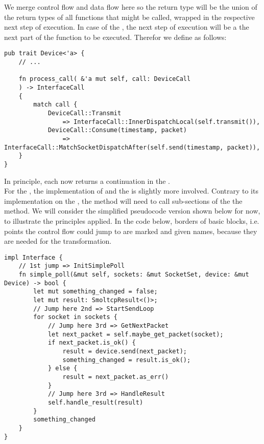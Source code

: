 We merge control flow and data flow here so the return type will be the union of the return types of all functions that might be called, wrapped in the respective next step of execution. In case of the \dev{}, the next step of execution will be a the next part of the  function to be executed. Therefor we define  as follows:
\begin{verbatim}
pub trait Device<'a> {
    // ...
    
    fn process_call( &'a mut self, call: DeviceCall
    ) -> InterfaceCall
    {
        match call {
            DeviceCall::Transmit
                => InterfaceCall::InnerDispatchLocal(self.transmit()),
            DeviceCall::Consume(timestamp, packet)
                => InterfaceCall::MatchSocketDispatchAfter(self.send(timestamp, packet)),
    }
}
\end{verbatim}

In principle, each  now returns a continuation in the \stack{}.\\

For the \stack{}, the implementation of  and the  is slightly more involved. Contrary to its implementation on the \dev{}, the  method will need to call sub-sections of the the  method. We will consider the simplified pseudocode version shown below for now, to illustrate the principles applied. In the code below, borders of basic blocks, i.e. points the control flow could jump to are marked and given names, because they are needed for the transformation. 

\begin{verbatim}
impl Interface {
    // 1st jump => InitSimplePoll
    fn simple_poll(&mut self, sockets: &mut SocketSet, device: &mut Device) -> bool {
        let mut something_changed = false;
        let mut result: SmoltcpResult<()>;
        // Jump here 2nd => StartSendLoop
        for socket in sockets {
            // Jump here 3rd => GetNextPacket
            let next_packet = self.maybe_get_packet(socket);
            if next_packet.is_ok() {
                result = device.send(next_packet);
                something_changed = result.is_ok();
            } else {
                result = next_packet.as_err()
            }
            // Jump here 3rd => HandleResult
            self.handle_result(result)
        }
        something_changed
    }
}
\end{verbatim}

